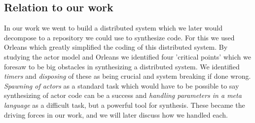 \subsection{Relation to our work} \label{AMRelation}
In our work we went to build a distributed system which we later would decompose to a repository we could use to synthesize code. For this we used Orleans which greatly simplified the coding of this distributed system. By studying the actor model and Orleans we identified four 'critical points' which we foresaw to be big obstacles in synthesizing a distributed system. We identified \textit{timers} and \textit{disposing} of these as being crucial and system breaking if done wrong. \textit{Spawning of actors} as a standard task which would have to be possible to say synthesizing of actor code can be a success and \textit{handling parameters in a meta language} as a difficult task, but a powerful tool for synthesis. These became the driving forces in our work, and we will later discuss how we handled each.